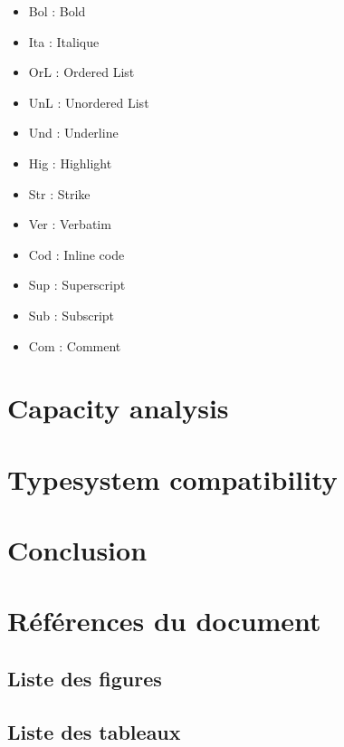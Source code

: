 \documentclass[a4paper,12pt]{article}
\begin{document}
\begin{tablenotes}
\begin{multicols}{3}\small
\begin{itemize}
  \item Bol : Bold
  \item Ita : Italique
  \item OrL : Ordered List
  \item UnL : Unordered List
  \item Und : Underline
  \item Hig : Highlight
  \item Str : Strike
  \item Ver : Verbatim
  \item Cod : Inline code
  \item Sup : Superscript
  \item Sub : Subscript
  \item Com : Comment
\end{itemize}
\end{multicols}
\end{tablenotes}
\section{Capacity analysis}
\label{sec:orgee9d433}

\section{Typesystem compatibility}
\label{sec:org1e92624}
\section{Conclusion}
\label{sec:org21130ee}

\clearpage
\section{Références du document}
\label{sec:org132f5da}
\subsection{Liste des figures}
\label{sec:orgd7f2fe1}
\renewcommand{\listfigurename}{\vspace{-2em}}
\listoffigures
\subsection{Liste des tableaux}
\label{sec:org7b63354}
\renewcommand{\listtablename}{\vspace{-2em}}
\listoftables
\end{document}
